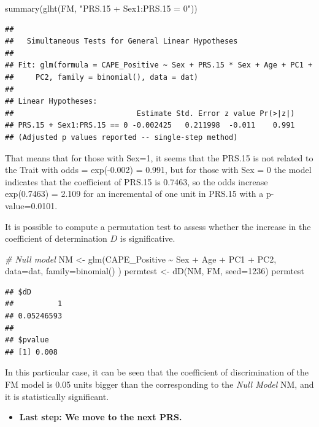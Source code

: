 \documentclass[
]{article}
\newenvironment{Shaded}{\begin{snugshade}}{\end{snugshade}}
\newcommand{\AttributeTok}[1]{\textcolor[rgb]{0.77,0.63,0.00}{#1}}
\newcommand{\CommentTok}[1]{\textcolor[rgb]{0.56,0.35,0.01}{\textit{#1}}}
\newcommand{\DecValTok}[1]{\textcolor[rgb]{0.00,0.00,0.81}{#1}}
\newcommand{\FunctionTok}[1]{\textcolor[rgb]{0.00,0.00,0.00}{#1}}
\newcommand{\NormalTok}[1]{#1}
\newcommand{\OtherTok}[1]{\textcolor[rgb]{0.56,0.35,0.01}{#1}}
\newcommand{\SpecialCharTok}[1]{\textcolor[rgb]{0.00,0.00,0.00}{#1}}
\newcommand{\StringTok}[1]{\textcolor[rgb]{0.31,0.60,0.02}{#1}}
\providecommand{\tightlist}{%
  \setlength{\itemsep}{0pt}\setlength{\parskip}{0pt}}
\begin{document}
\begin{Shaded}
\begin{Highlighting}[]
\FunctionTok{summary}\NormalTok{(}\FunctionTok{glht}\NormalTok{(FM, }\StringTok{"PRS.15  + Sex1:PRS.15 = 0"}\NormalTok{))}
\end{Highlighting}
\end{Shaded}

\begin{verbatim}
## 
##   Simultaneous Tests for General Linear Hypotheses
## 
## Fit: glm(formula = CAPE_Positive ~ Sex + PRS.15 * Sex + Age + PC1 + 
##     PC2, family = binomial(), data = dat)
## 
## Linear Hypotheses:
##                            Estimate Std. Error z value Pr(>|z|)
## PRS.15 + Sex1:PRS.15 == 0 -0.002425   0.211998  -0.011    0.991
## (Adjusted p values reported -- single-step method)
\end{verbatim}

That means that for those with Sex=1, it seems that the PRS.15 is not
related to the Trait with odds = exp(-0.002) = 0.991, but for those with
Sex = 0 the model indicates that the coefficient of PRS.15 is 0.7463, so
the odds increase exp(0.7463) = 2.109 for an incremental of one unit in
PRS.15 with a p-value=0.0101.

It is possible to compute a permutation test to assess whether the
increase in the coefficient of determination \(D\) is significative.

\begin{Shaded}
\begin{Highlighting}[]
\CommentTok{\# Null model}
\NormalTok{NM }\OtherTok{\textless{}{-}} \FunctionTok{glm}\NormalTok{(CAPE\_Positive }\SpecialCharTok{\textasciitilde{}}\NormalTok{  Sex }\SpecialCharTok{+}\NormalTok{ Age }\SpecialCharTok{+}\NormalTok{ PC1 }\SpecialCharTok{+}\NormalTok{ PC2, }\AttributeTok{data=}\NormalTok{dat, }\AttributeTok{family=}\FunctionTok{binomial}\NormalTok{() )}
\NormalTok{permtest }\OtherTok{\textless{}{-}} \FunctionTok{dD}\NormalTok{(NM, FM, }\AttributeTok{seed=}\DecValTok{1236}\NormalTok{)}
\NormalTok{permtest}
\end{Highlighting}
\end{Shaded}

\begin{verbatim}
## $dD
##          1 
## 0.05246593 
## 
## $pvalue
## [1] 0.008
\end{verbatim}

In this particular case, it can be seen that the coefficient of
discrimination of the FM model is 0.05 units bigger than the
corresponding to the \emph{Null Model} NM, and it is statistically
significant.

\begin{itemize}
\tightlist
\item
  \textbf{Last step: We move to the next PRS.}
\end{itemize}
\end{document}
